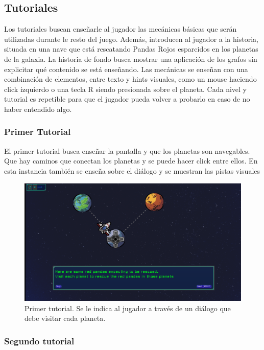 \subsection{Tutoriales}

Los tutoriales buscan enseñarle al jugador las mecánicas básicas que serán utilizadas durante le resto del juego. Además, introducen al jugador a la historia, situada en una nave que está rescatando Pandas Rojos esparcidos en los planetas de la galaxia. La historia de fondo busca mostrar una aplicación de los grafos sin explicitar qué contenido se está enseñando.
Las mecánicas se enseñan con una combinación de elementos, entre texto y hints visuales, como un mouse haciendo click izquierdo o una tecla R siendo presionada sobre el planeta.
Cada nivel y tutorial es repetible para que el jugador pueda volver a probarlo en caso de no haber entendido algo.

\subsubsection{Primer Tutorial}

El primer tutorial busca enseñar la pantalla y que los planetas son navegables. Que hay caminos que conectan los planetas y se puede hacer click entre ellos. En esta instancia también se enseña sobre el diálogo y se muestran las pistas visuales


\begin{figure}[h]
	\centering
	\includegraphics[scale=0.3]{imagenes/FirstTutorial.png}
	\caption{Primer tutorial. Se le indica al jugador a través de un diálogo que debe visitar cada planeta.}
	\label{FirstTutorial}
\end{figure}



\subsubsection{Segundo tutorial}

